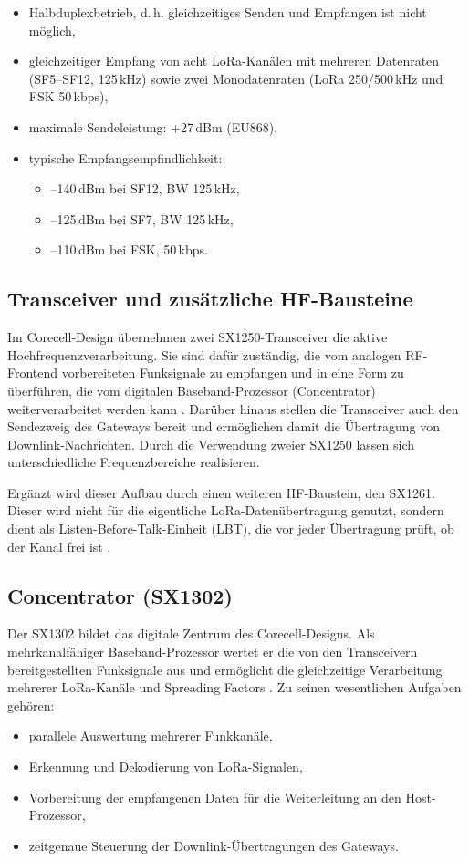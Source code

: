 \begin{itemize}
	\item Halbduplexbetrieb, d.\,h. gleichzeitiges Senden und Empfangen ist nicht möglich,
	\item gleichzeitiger Empfang von acht LoRa-Kanälen mit mehreren Datenraten (SF5–SF12, 125\,kHz) sowie zwei Monodatenraten (LoRa 250/500\,kHz und FSK 50\,kbps),
	\item maximale Sendeleistung: +27\,dBm (EU868),
	\item typische Empfangsempfindlichkeit:
	\begin{itemize}
		\item –140\,dBm bei SF12, BW 125\,kHz,
		\item –125\,dBm bei SF7, BW 125\,kHz,
		\item –110\,dBm bei FSK, 50\,kbps.
	\end{itemize}
\end{itemize}

\subsection{Transceiver und zusätzliche HF-Bausteine}
	Im Corecell-Design übernehmen zwei SX1250-Transceiver die aktive Hochfrequenzverarbeitung. Sie sind dafür zuständig, die vom analogen RF-Frontend vorbereiteten Funksignale zu empfangen und in eine Form zu überführen, die vom digitalen Baseband-Prozessor (Concentrator) weiterverarbeitet werden kann \cite{Semtech:2019}. Darüber hinaus stellen die Transceiver auch den Sendezweig des Gateways bereit und ermöglichen damit die Übertragung von Downlink-Nachrichten. Durch die Verwendung zweier SX1250 lassen sich unterschiedliche Frequenzbereiche realisieren.

	Ergänzt wird dieser Aufbau durch einen weiteren HF-Baustein, den SX1261. Dieser wird nicht für die eigentliche LoRa-Datenübertragung genutzt, sondern dient als Listen-Before-Talk-Einheit (LBT), die vor jeder Übertragung prüft, ob der Kanal frei ist \cite{Semtech:2024b}. 

\subsection{Concentrator (SX1302)}
	Der SX1302 bildet das digitale Zentrum des Corecell-Designs. Als mehrkanalfähiger Baseband-Prozessor wertet er die von den Transceivern bereitgestellten Funksignale aus und ermöglicht die gleichzeitige Verarbeitung mehrerer LoRa-Kanäle und Spreading Factors \cite{Semtech:2019b}. Zu seinen wesentlichen Aufgaben gehören:
\begin{itemize}
	\item parallele Auswertung mehrerer Funkkanäle,
	\item Erkennung und Dekodierung von LoRa-Signalen,
	\item Vorbereitung der empfangenen Daten für die Weiterleitung an den Host-Prozessor,
	\item zeitgenaue Steuerung der Downlink-Übertragungen des Gateways.
\end{itemize}


